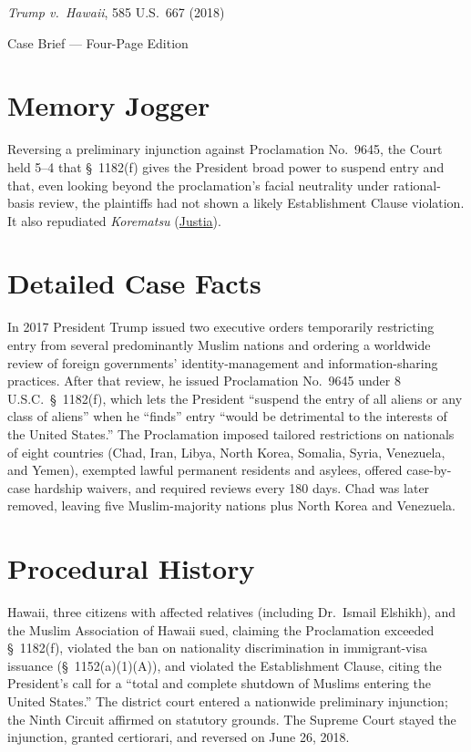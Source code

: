 \documentclass[12pt]{article}
\begin{document}
\begin{center}
{\LARGE \textit{Trump v.\ Hawaii}, 585 U.S.\ 667 (2018)\par}
\vspace{0.8em}
{\large Case Brief --- Four-Page Edition\par}
\end{center}
\vspace{1em}

\section{Memory Jogger}

Reversing a preliminary injunction against Proclamation No.~9645, the Court held 5--4 that \S~1182(f) gives the President broad power to suspend entry and that, even looking beyond the proclamation's facial neutrality under rational-basis review, the plaintiffs had not shown a likely Establishment Clause violation. It also repudiated \textit{Korematsu} (\href{https://supreme.justia.com/cases/federal/us/585/17-965/}{Justia}).

\section{Detailed Case Facts}

In 2017 President Trump issued two executive orders temporarily restricting entry from several predominantly Muslim nations and ordering a worldwide review of foreign governments' identity-management and information-sharing practices. After that review, he issued Proclamation No.~9645 under 8 U.S.C.\ \S~1182(f), which lets the President ``suspend the entry of all aliens or any class of aliens'' when he ``finds'' entry ``would be detrimental to the interests of the United States.'' The Proclamation imposed tailored restrictions on nationals of eight countries (Chad, Iran, Libya, North Korea, Somalia, Syria, Venezuela, and Yemen), exempted lawful permanent residents and asylees, offered case-by-case hardship waivers, and required reviews every 180 days. Chad was later removed, leaving five Muslim-majority nations plus North Korea and Venezuela.

\section{Procedural History}

Hawaii, three citizens with affected relatives (including Dr.\ Ismail Elshikh), and the Muslim Association of Hawaii sued, claiming the Proclamation exceeded \S~1182(f), violated the ban on nationality discrimination in immigrant-visa issuance (\S~1152(a)(1)(A)), and violated the Establishment Clause, citing the President's call for a ``total and complete shutdown of Muslims entering the United States.'' The district court entered a nationwide preliminary injunction; the Ninth Circuit affirmed on statutory grounds. The Supreme Court stayed the injunction, granted certiorari, and reversed on June 26, 2018.
\end{document}
